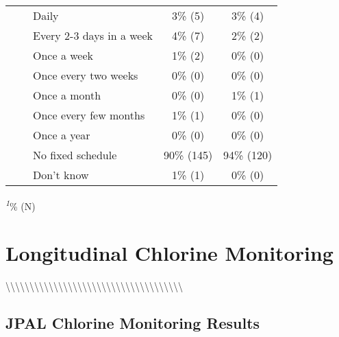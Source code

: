 \documentclass[
]{article}
\begin{document}
\begin{longtable}{lcc}
    Daily & 3\% (5) & 3\% (4) \\ 
    Every 2-3 days in a week & 4\% (7) & 2\% (2) \\ 
    Once a week & 1\% (2) & 0\% (0) \\ 
    Once every two weeks & 0\% (0) & 0\% (0) \\ 
    Once a month & 0\% (0) & 1\% (1) \\ 
    Once every few months & 1\% (1) & 0\% (0) \\ 
    Once a year & 0\% (0) & 0\% (0) \\ 
    No fixed schedule & 90\% (145) & 94\% (120) \\ 
    Don’t know & 1\% (1) & 0\% (0) \\ 
\bottomrule
\end{longtable}
\begin{minipage}{\linewidth}
\textsuperscript{\textit{1}}\% (N)\\
\end{minipage}

\newpage

\hypertarget{longitudinal-chlorine-monitoring}{%
\section{Longitudinal Chlorine
Monitoring}\label{longitudinal-chlorine-monitoring}}

\textbackslash\textbackslash\textbackslash\textbackslash\textbackslash\textbackslash\textbackslash\textbackslash\textbackslash\textbackslash\textbackslash\textbackslash\textbackslash\textbackslash\textbackslash\textbackslash\textbackslash\textbackslash\textbackslash\textbackslash\textbackslash\textbackslash\textbackslash\textbackslash\textbackslash\textbackslash\textbackslash\textbackslash\textbackslash\textbackslash\textbackslash\textbackslash\textbackslash\textbackslash\textbackslash\textbackslash\textbackslash{}

\hypertarget{jpal-chlorine-monitoring-results}{%
\subsection{JPAL Chlorine Monitoring
Results}\label{jpal-chlorine-monitoring-results}}
\end{document}
